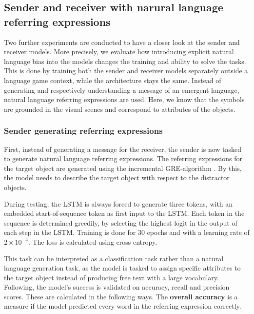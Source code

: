 \documentclass[11pt]{article}
\begin{document}
\subsection{Sender and receiver with narural language referring expressions}
Two further experiments are conducted to have a closer look at the sender and receiver models.
More precisely, we evaluate how introducing explicit natural language bias into the models changes the training and ability to solve the tasks.
This is done by training both the sender and receiver models separately outside a language game context, while the architecture stays the same.
Instead of generating and respectively understanding a message of an emergent language, natural language referring expressions are used.
Here, we know that the symbols are grounded in the visual scenes and correspond to attributes of the objects.

\subsubsection{%
  Sender generating referring expressions}

First, instead of generating a message for the receiver, the sender is now tasked to generate natural language referring expressions.
The referring expressions for the target object are generated using the incremental GRE-algorithm \citep{Dale1995}. %
By this, the model needs to describe the target object with respect to the distractor objects.


During testing, the LSTM is always forced to generate three tokens, with an embedded start-of-sequence token as first input to the LSTM.
Each token in the sequence is determined greedily, by selecting the highest logit in the output of each step in the LSTM.
Training is done for 30 epochs and with a learning rate of $2\times10^{-4}$.
The loss is calculated using cross entropy.

This task can be interpreted as a classification task rather than a natural language generation task, as the model is tasked to assign specific attributes to the target object instead of producing free text with a large vocabulary.
Following, the model's success is validated on accuracy, recall and precision scores.
These are calculated in the following ways.
The \textbf{overall accuracy} is a measure if the model predicted every word in the referring expression correctly.
\end{document}
